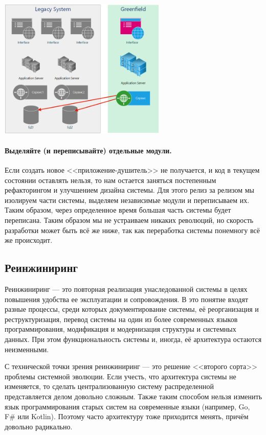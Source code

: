 \documentclass{../../text-style}
\begin{document}
\begin{center}
    \includegraphics[width=0.6\textwidth]{stranglerApp.png}
\end{center}

\paragraph{Выделяйте (и переписывайте) отдельные модули.} Если создать новое <<приложение-душитель>> не получается, и код в текущем состоянии оставлять нельзя, то нам остается заняться постепенным рефакторингом и улучшением дизайна системы. Для этого релиз за релизом мы изолируем части системы, выделяем независимые модули и переписываем их. Таким образом, через определенное время большая часть системы будет переписана. Таким образом мы не устраиваем никаких революций, но скорость разработки может быть всё же ниже, так как переработка системы понемногу всё же происходит.

\subsection{Реинжиниринг}

Реинжиниринг --- это повторная реализация унаследованной системы в целях повышения удобства ее эксплуатации и сопровождения. В это понятие входят разные процессы, среди которых документирование системы, её реорганизация и реструктуризация, перевод системы на один из более современных языков программирования, модификация и модернизация структуры и системных данных. При этом функциональность системы и, иногда, её архитектура остаются неизменными.

С технической точки зрения реинжиниринг --- это решение <<второго сорта>> проблемы системной эволюции. Если учесть, что архитектура системы не изменяется, то сделать централизованную систему распределенной представляется делом довольно сложным. Также таким способом нельзя изменить язык программирования старых систем на современные языки (например, Go, F\# или Kotlin). Поэтому часто архитектуру тоже приходится менять, причём довольно радикально.
\end{document}
